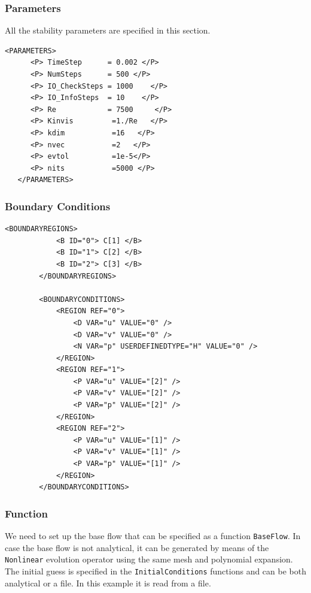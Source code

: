 \subsubsection{Parameters}

All the stability parameters are specified in this section.

    \begin{lstlisting}[style=XMLStyle]
<PARAMETERS>
      <P> TimeStep      = 0.002 </P>
      <P> NumSteps      = 500 </P>
      <P> IO_CheckSteps = 1000    </P>
      <P> IO_InfoSteps  = 10    </P>
      <P> Re            = 7500     </P>
      <P> Kinvis         =1./Re   </P>
      <P> kdim           =16   </P>
      <P> nvec           =2   </P>
      <P> evtol          =1e-5</P>
      <P> nits           =5000 </P>
   </PARAMETERS>
         \end{lstlisting}


\subsubsection{Boundary Conditions}

    \begin{lstlisting}[style=XMLStyle]
 <BOUNDARYREGIONS>
            <B ID="0"> C[1] </B>
            <B ID="1"> C[2] </B>
            <B ID="2"> C[3] </B>
        </BOUNDARYREGIONS>

        <BOUNDARYCONDITIONS>
            <REGION REF="0">
                <D VAR="u" VALUE="0" />
                <D VAR="v" VALUE="0" />
                <N VAR="p" USERDEFINEDTYPE="H" VALUE="0" />
            </REGION>
            <REGION REF="1">
                <P VAR="u" VALUE="[2]" />
                <P VAR="v" VALUE="[2]" />
                <P VAR="p" VALUE="[2]" />
            </REGION>
            <REGION REF="2">
                <P VAR="u" VALUE="[1]" />
                <P VAR="v" VALUE="[1]" />
                <P VAR="p" VALUE="[1]" />
            </REGION>
        </BOUNDARYCONDITIONS>
                 \end{lstlisting}

\subsubsection{Function}

We need to set up the base flow that can be specified as a function \texttt{BaseFlow}. In case the base flow is not analytical, it can be generated by means of the \texttt{Nonlinear} evolution operator using the same mesh and polynomial expansion. The initial guess is specified in the \texttt{InitialConditions} functions and can be both analytical or a file. In this example it is read from a file.

